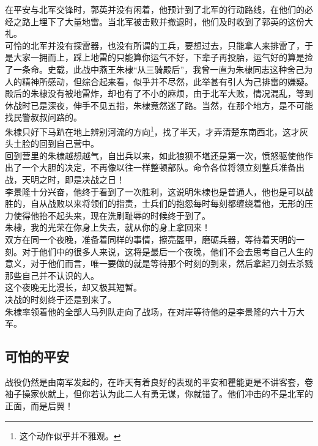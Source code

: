 \begin{multicols}{\theparacolNo}
在平安与北军交锋时，郭英并没有闲着，他预计到了北军的行动路线，在他们的必经之路上埋下了大量地雷。当北军被击败并撤退时，他们及时收到了郭英的这份大礼。\\

可怜的北军并没有探雷器，也没有所谓的工兵，要想过去，只能拿人来排雷了，于是大家一拥而上，踩上地雷的只能算你运气不好，下辈子再投胎，运气好的算是捡了一条命。史载，此战中燕王朱棣“从三骑殿后”，我曾一直为朱棣同志这种舍己为人的精神所感动，但综合起来看，似乎并不尽然，此举甚有引人为己排雷的嫌疑。\\

殿后的朱棣没有被地雷炸，却也有了不小的麻烦，由于北军大败，情况混乱，等到休战时已是深夜，伸手不见五指，朱棣竟然迷了路。当然，在那个地方，是不可能找民警叔叔问路的。\\

朱棣只好下马趴在地上辨别河流的方向\footnote{这个动作似乎并不雅观。}，找了半天，才弄清楚东南西北，这才灰头土脸的回到自己营中。\\

回到营里的朱棣越想越气，自出兵以来，如此狼狈不堪还是第一次，愤怒驱使他作出了一个大胆的决定，不再像以往一样整顿部队。命令各位将领立刻整兵准备出战，天明之时，即是决战之日！\\

李景隆十分兴奋，他终于看到了一次胜利，这说明朱棣也是普通人，他也是可以战胜的，自从战败以来将领们的指责，士兵们的抱怨每时每刻都缠绕着他，无形的压力使得他抬不起头来，现在洗刷耻辱的时候终于到了。\\

朱棣，我的光荣在你身上失去，就从你的身上拿回来！\\

双方在同一个夜晚，准备着同样的事情，擦亮盔甲，磨砺兵器，等待着天明的一刻。对于他们中的很多人来说，这将是最后一个夜晚，他们不会去思考自己人生的意义，对于他们而言，唯一要做的就是等待那个时刻的到来，然后拿起刀剑去杀戮那些自己并不认识的人。\\

这个夜晚无比漫长，却又极其短暂。\\

决战的时刻终于还是到来了。\\

朱棣率领着他的全部人马列队走向了战场，在对岸等待他的是李景隆的六十万大军。\\

\subsection{可怕的平安}
战役仍然是由南军发起的，在昨天有着良好的表现的平安和瞿能更是不讲客套，卷袖子操家伙就上，但你若认为此二人有勇无谋，你就错了。他们冲击的不是北军的正面，而是后翼！\\


\end{multicols}
